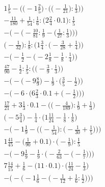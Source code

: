 \documentclass[8pt]{article}
\begin{document}
\begin{align}
1\frac{1}{5} - \bigg(\Big(-1\frac{2}{5}\Big) \cdot \Big(\big(-\frac{1}{21}\big) : \frac{1}{3}\Big)\bigg) \\
-\frac{11}{180} + \frac{1}{54} : \frac{1}{6} : \big(2\frac{2}{4} \cdot 0.1\big) : \frac{1}{5} \\
-\bigg(-\Big(-\frac{10}{81} : \frac{1}{9} - \big(\frac{1}{27} : \frac{1}{3}\big)\Big)\bigg) \\
\Big(-\frac{1}{32}\Big) : \frac{1}{8} : \Big(1\frac{3}{4} \cdot \big(-\frac{3}{28} + \frac{1}{4}\big)\Big) \\
-\Big(-\frac{1}{2} - \big(-2\frac{1}{8} - \frac{1}{8} \cdot \frac{1}{4}\big)\Big) \\
\frac{47}{90} - \frac{1}{2} : \frac{1}{5} : \Big(\big(-\frac{3}{9} \cdot \frac{1}{3}\big)\Big) \\
-\Big(-\big(-9\frac{8}{9}\big) - \frac{1}{9} \cdot \big(\frac{3}{5} - \frac{1}{2}\big)\Big) \\
-\bigg(-6 \cdot \Big(6\frac{2}{3} \cdot 0.1 + \big(-\frac{1}{2}\big)\Big)\bigg) \\
\frac{17}{21} + 3\frac{1}{3} \cdot 0.1 - \Big(\big(-\frac{4}{189}\big) : \frac{1}{9} + \frac{1}{3}\Big) \\
\big(-5\frac{3}{4}\big) - \frac{1}{4} \cdot \big(1\frac{11}{24} - \frac{1}{8} \cdot \frac{1}{8}\big) \\
-\bigg(-1\frac{1}{9} - \Big(\big(-\frac{1}{54}\big) : \big(-\frac{1}{30} + \frac{1}{5}\big)\Big)\bigg) \\
1\frac{41}{45} - \big(\frac{1}{90} + 0.1\big) \cdot \big(-\frac{1}{9}\big) : \frac{1}{5} \\
-\bigg(-9\frac{1}{9} - \frac{1}{9} \cdot \Big(-\frac{2}{63} - \big(-\frac{1}{7}\big)\Big)\bigg) \\
7\frac{14}{15} + \frac{1}{6} - \big(11 \cdot 0.1\big) \cdot \big(\frac{11}{24} - \frac{1}{3}\big) \\
-\bigg(-\Big(-1\frac{1}{6} - \big(-\frac{1}{12} + \frac{1}{6} : \frac{1}{2}\big)\Big)\bigg)
\end{align}
\end{document}
